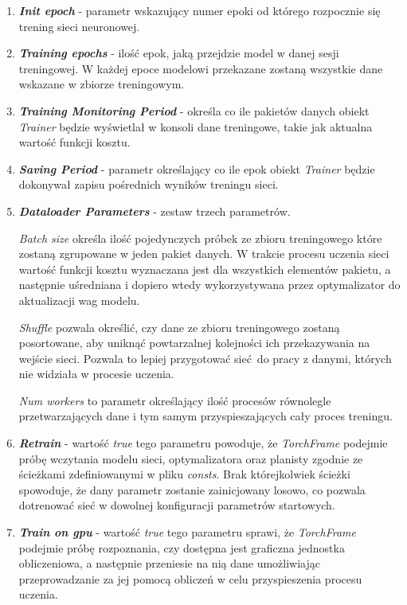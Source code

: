 \begin{enumerate}
    \item \textbf{\textit{Init epoch}} - parametr wskazujący numer epoki od którego
    rozpocznie się trening sieci neuronowej.

    \item \textbf{\textit{Training epochs}} - ilość epok, jaką przejdzie model w danej
    sesji treningowej. W każdej epoce modelowi przekazane zostaną wszystkie dane
    wskazane w zbiorze treningowym.

    \item \textbf{\textit{Training Monitoring Period}} - określa co ile pakietów danych
    obiekt \textit{Trainer} będzie wyświetlał w konsoli dane treningowe, takie jak
    aktualna wartość funkcji kosztu.

    \item \textbf{\textit{Saving Period}} - parametr określający co ile epok
    obiekt \textit{Trainer} będzie dokonywał zapisu pośrednich wyników treningu sieci.

    \item \textbf{\textit{Dataloader Parameters}} - zestaw trzech parametrów.

    \textit{Batch size} określa ilość pojedynczych próbek ze zbioru treningowego które zostaną zgrupowane
    w jeden pakiet danych. W trakcie procesu uczenia sieci wartość funkcji kosztu wyznaczana
    jest dla wszystkich elementów pakietu, a następnie uśredniana i dopiero wtedy
    wykorzystywana przez optymalizator do aktualizacji wag modelu.

    \textit{Shuffle} pozwala określić, czy dane ze zbioru treningowego zostaną
    posortowane, aby uniknąć powtarzalnej kolejności ich przekazywania na wejście
    sieci. Pozwala to lepiej przygotować sieć do pracy z danymi, których nie widziała
    w procesie uczenia.

    \textit{Num workers} to parametr  określający ilość procesów równolegle przetwarzających
    dane i tym samym przyspieszających cały proces treningu.

    \item \textbf{\textit{Retrain}} - wartość \textit{true} tego parametru powoduje, że
    \textit{TorchFrame} podejmie próbę wczytania modelu sieci, optymalizatora oraz
    planisty zgodnie ze ścieżkami zdefiniowanymi w pliku \textit{consts}. Brak którejkolwiek
    ścieżki spowoduje, że dany parametr zostanie zainicjowany losowo, co pozwala
    dotrenować sieć w dowolnej konfiguracji parametrów startowych.

    \item \textbf{\textit{Train on gpu}} - wartość \textit{true} tego parametru sprawi, że
    \textit{TorchFrame} podejmie próbę rozpoznania, czy dostępna jest graficzna jednostka
    obliczeniowa, a następnie przeniesie na nią dane umożliwiając przeprowadzanie
    za jej pomocą obliczeń w celu przyspieszenia procesu uczenia.


\end{enumerate}
